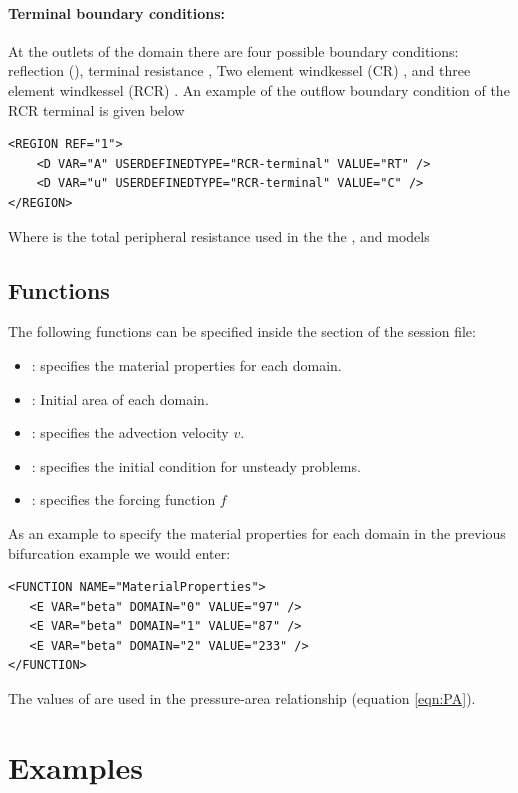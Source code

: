 \paragraph{Terminal boundary conditions:~} At the outlets of the domain there are four possible boundary conditions: reflection (), terminal resistance , 
Two element windkessel (CR)  , and three element windkessel (RCR) .  An example of the outflow boundary condition of the RCR terminal is given below
\begin{lstlisting}[style=XmlStyle]
<REGION REF="1">
	<D VAR="A" USERDEFINEDTYPE="RCR-terminal" VALUE="RT" />
	<D VAR="u" USERDEFINEDTYPE="RCR-terminal" VALUE="C" />
</REGION>
\end{lstlisting}
Where  is the total peripheral resistance  used in the the  ,  and   models

\subsection{Functions}
The following functions can be specified inside the  section
of the session file:
\begin{itemize}
\item  {}: specifies the material properties for each domain.
\item  {}: Initial area of each domain.
\item {}: specifies the advection velocity $v$.
\item {}: specifies the initial condition for unsteady
 problems.
\item {}: specifies the forcing function $f$
\end{itemize}

As an example to specify the material properties for each domain in the previous bifurcation example we would enter:
\begin{lstlisting}[style=XmlStyle]
<FUNCTION NAME="MaterialProperties">
   <E VAR="beta" DOMAIN="0" VALUE="97" />
   <E VAR="beta" DOMAIN="1" VALUE="87" />
   <E VAR="beta" DOMAIN="2" VALUE="233" />
</FUNCTION>
\end{lstlisting}
The values of  are used in the pressure-area relationship (equation \ref{eqn:PA}). 

\section{Examples}

